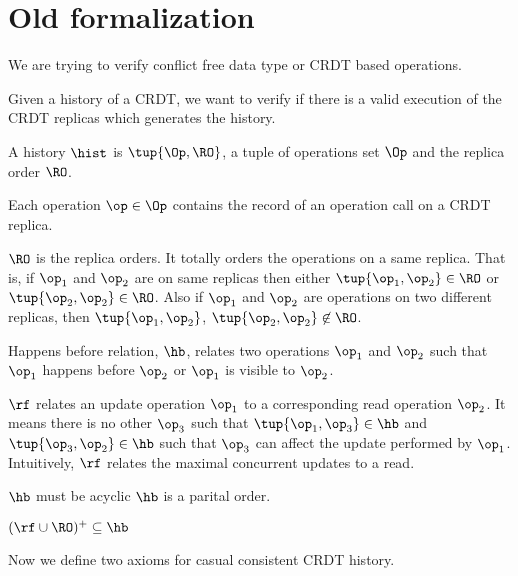 
\section{Old formalization}

We are trying to verify conflict free data type or CRDT based operations.

Given a history of a CRDT, we want to verify if there is a valid execution of the CRDT replicas which generates the history.

\begin{definition}
 A history $\hist$ is $\tup{\Op, \RO}$, a tuple of operations set $\Op$ and the replica order $\RO$.
\end{definition}


Each operation $\op \in \Op$ contains the record of an operation call on a CRDT replica.

$\RO$ is the replica orders. It totally orders the operations on a same replica. That is, if $\op_1$ and $\op_2$ are on same replicas then either $\tup{\op_1, \op_2} \in \RO$ or $\tup{\op_2, \op_2} \in \RO$. Also if $\op_1$ and $\op_2$ are operations on two different replicas, then $\tup{\op_1, \op_2}$, $\tup{\op_2, \op_2} \not\in \RO$.

\begin{definition}
 Happens before relation, $\hb$, relates two operations $\op_1$ and $\op_2$ such that $\op_1$ happens before $\op_2$ or $\op_1$ is visible to $\op_2$.
\end{definition}


\begin{definition}
 $\rf$ relates an update operation $\op_1$ to a corresponding read operation $\op_2$. It means there is no other $\op_3$ such that $\tup{\op_1, \op_3} \in \hb$ and $\tup{\op_3, \op_2} \in \hb$ such that $\op_3$ can affect the update performed by $\op_1$. Intuitively, $\rf$ relates the maximal concurrent updates to a read.
\end{definition}

$\hb$ must be acyclic \ie $\hb$ is a parital order.

$(\rf \cup \RO)^+ \subseteq \hb$

Now we define two axioms for casual consistent CRDT history.

